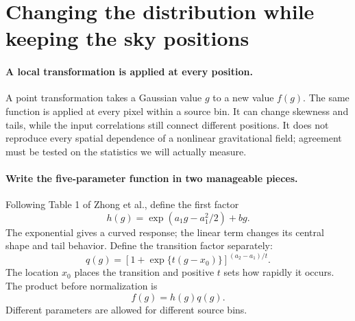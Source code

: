 \documentclass[11pt]{article}
\begin{document}
\section{Changing the distribution while keeping the sky positions}
\paragraph{A local transformation is applied at every position.}
A point transformation takes a Gaussian value $g$ to a new value $f(g)$.
The same function is applied at every pixel within a source bin. It can
change skewness and tails, while the input correlations still connect
different positions. It does not reproduce every spatial dependence of
a nonlinear gravitational field; agreement must be tested on the statistics
we will actually measure.

\paragraph{Write the five-parameter function in two manageable pieces.}
Following Table 1 of Zhong et al., define the first factor
\begin{equation}
 h(g)=\exp(a_1g-a_1^2/2)+bg.
\end{equation}
The exponential gives a curved response; the linear term changes its
central shape and tail behavior. Define the transition factor separately:
\begin{equation}
 q(g)=\left[1+\exp\{t(g-x_0)\}\right]^{(a_2-a_1)/t}.
\end{equation}
The location $x_0$ places the transition and positive $t$ sets how rapidly
it occurs. The product before normalization is
\begin{equation}
 f(g)=h(g)q(g).
\end{equation}
Different parameters are allowed for different source bins.
\end{document}

